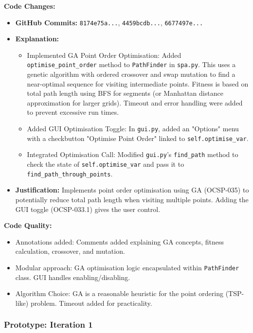 \textbf{Code Changes:}
\begin{itemize}
	\item \textbf{GitHub Commits:} \verb|8174e75a...|, \verb|4459bcdb...|, \verb|6677497e...|
	\item \textbf{Explanation:}
	\begin{itemize}
		\item Implemented GA Point Order Optimisation: Added \verb|optimise_point_order| method to \verb|PathFinder| in \verb|spa.py|. This uses a genetic algorithm with ordered crossover and swap mutation to find a near-optimal sequence for visiting intermediate points. Fitness is based on total path length using BFS for segments (or Manhattan distance approximation for larger grids). Timeout and error handling were added to prevent excessive run times.
		\item Added GUI Optimisation Toggle: In \verb|gui.py|, added an "Options" menu with a checkbutton "Optimise Point Order" linked to \verb|self.optimise_var|.
		\item Integrated Optimisation Call: Modified \verb|gui.py|'s \verb|find_path| method to check the state of \verb|self.optimise_var| and pass it to \verb|find_path_through_points|.
	\end{itemize}
	\item \textbf{Justification:} Implements point order optimisation using GA (OCSP-035) to potentially reduce total path length when visiting multiple points. Adding the GUI toggle (OCSP-033.1) gives the user control.
\end{itemize}

\textbf{Code Quality:}
\begin{itemize}
	\item Annotations added: Comments added explaining GA concepts, fitness calculation, crossover, and mutation.
	\item Modular approach: GA optimisation logic encapsulated within \verb|PathFinder| class. GUI handles enabling/disabling.
	\item Algorithm Choice: GA is a reasonable heuristic for the point ordering (TSP-like) problem. Timeout added for practicality.
\end{itemize}

\subsubsection*{Prototype: Iteration 1}



